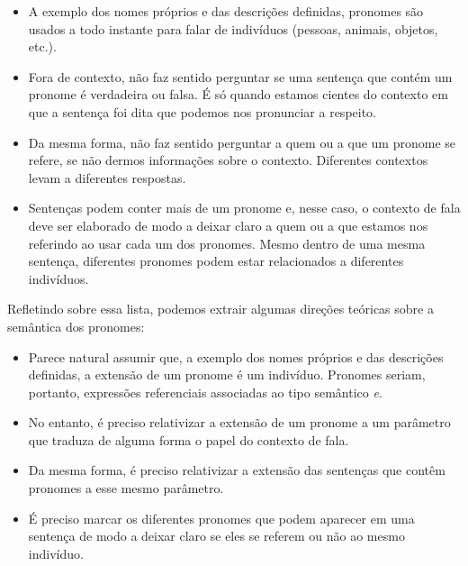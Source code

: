 \begin{itemize}

\item A exemplo dos nomes próprios e das descrições definidas, pronomes são usados a todo instante para falar de indivíduos (pessoas, animais, objetos, etc.).

\item Fora de contexto, não faz sentido perguntar se uma
    sentença que contém um pronome é verdadeira ou falsa. É só
    quando estamos cientes do contexto em que a sentença foi
    dita que podemos nos pronunciar a respeito.

\item Da mesma forma, não faz sentido perguntar a quem ou a que
    um pronome se refere, se não dermos informações sobre o
    contexto. Diferentes contextos levam a diferentes
    respostas.

\item Sentenças podem conter mais de um pronome e, nesse caso,
    o contexto de fala deve ser elaborado de modo a deixar
    claro a quem ou a que estamos nos referindo ao usar cada
    um dos pronomes. Mesmo dentro de uma mesma sentença,
    diferentes pronomes podem estar relacionados a diferentes
    indivíduos.

\end{itemize}


Refletindo sobre essa lista, podemos extrair algumas direções
teóricas sobre a semântica dos pronomes:

\begin{itemize}

\item Parece natural assumir que, a exemplo dos nomes próprios
    e das descrições definidas, a extensão de um pronome é um
    indivíduo. Pronomes seriam, portanto, expressões
    referenciais associadas ao tipo semântico \textit{e}.

\item No entanto, é preciso relativizar a extensão de um
    pronome a um parâmetro que traduza de alguma forma o papel
    do contexto de fala.

\item Da mesma forma, é preciso relativizar a extensão das
    sentenças que contêm pronomes a esse mesmo parâmetro.

\item É preciso marcar os diferentes pronomes que podem
    aparecer em uma sentença de modo a deixar claro se eles se
    referem ou não ao mesmo indivíduo.


\end{itemize}


